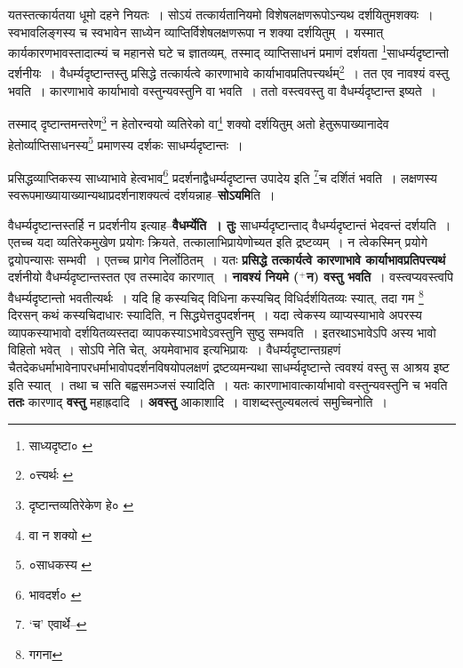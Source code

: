 \documentclass[article,12pt,a4paper]{memoir}
\newcommand{\add}[1]{($^{+}$#1)}
\begin{document}
	यतस्तत्कार्यतया धूमो दहने नियतः । सोऽयं तत्कार्यतानियमो विशेषलक्षणरूपोऽन्यथ दर्शयितुमशक्यः । स्वभावलिङ्गस्य च स्वभावेन साध्येन व्याप्तिर्विशेषलक्षणरूपा न शक्या दर्शयितुम् । यस्मात् कार्यकारणभावस्तादात्म्यं च महानसे घटे च ज्ञातव्यम्, तस्माद् व्याप्तिसाधनं प्रमाणं दर्शयता \footnote{साध्यदृष्टा० \cite{dp-msB}}साधर्म्यदृष्टान्तो दर्शनीयः । वैधर्म्यदृष्टान्तस्तु प्रसिद्धे तत्कार्यत्वे कारणाभावे कार्याभावप्रतिपत्त्यर्थम्\footnote{०त्त्यर्थः \cite{dp-edE}} । तत एव नावश्यं वस्तु भवति । कारणाभावे कार्याभावो वस्तुन्यवस्तुनि वा भवति । ततो वस्त्ववस्तु वा वैधर्म्यदृष्टान्त इष्यते । 
	  
	तस्माद् दृष्टान्तमन्तरेण\footnote{दृष्टान्तव्यतिरेकेण हे० \cite{dp-msA} \cite{dp-edP} \cite{dp-edH} \cite{dp-edE} \cite{dp-edN}} न हेतोरन्वयो व्यतिरेको वा\footnote{वा न शक्यो \cite{dp-msA} \cite{dp-edP} \cite{dp-edH} \cite{dp-edE} \cite{dp-edN}} शक्यो दर्शयितुम् अतो हेतुरूपाख्यानादेव हेतोर्व्याप्तिसाधनस्य\footnote{०साधकस्य \cite{dp-edE}} प्रमाणस्य दर्शकः साधर्म्यदृष्टान्तः । 
	  
	प्रसिद्धव्याप्तिकस्य साध्याभावे हेत्वभाव\footnote{भावदर्श० \cite{dp-msC} \cite{dp-msD}} प्रदर्शनाद्वैधर्म्यदृष्टान्त उपादेय इति \footnote{‘च’ एवार्थे--\cite{dp-msD-n}}च दर्शितं भवति । लक्षणस्य स्वरूपमाख्यायाख्यान्यथाप्रदर्शनाशक्यत्वं दर्शयन्नाह--\textbf{सोऽयमि}ति ।
	\pend
      

	  \pstart वैधर्म्यदृष्टान्तस्तर्हि न प्रदर्शनीय इत्याह--\textbf{वैधर्म्येति । तुः} साधर्म्यदृष्टान्ताद् वैधर्म्यदृष्टान्तं भेदवन्तं दर्शयति । एतच्च यदा व्यतिरेकमुखेण प्रयोगः क्रियते, तत्कालाभिप्रायेणोच्यत इति द्रष्टव्यम् । न त्वेकस्मिन् प्रयोगे द्वयोपन्यासः सम्भवी । एतच्च प्रागेव निर्लोठितम् । यतः \textbf{प्रसिद्धे तत्कार्यत्वे कारणाभावे कार्याभावप्रतिपत्त्यथं} दर्शनीयो वैधर्म्यदृष्टान्तस्तत एव तस्मादेव कारणात् । \textbf{नावश्यं नियमे \add{न} वस्तु भवति} । वस्त्वप्यवस्त्वपि वैधर्म्यदृष्टान्तो भवतीत्यर्थः । यदि हि कस्यचिद् विधिना कस्यचिद् विधिर्दर्शयितव्यः स्यात्, तदा गम \footnote{गगना} दिरसन् कथं कस्यचिदाधारः स्यादिति, न सिद्ध्येत्तदुपदर्शनम् । यदा त्वेकस्य व्याप्यस्याभावे अपरस्य व्यापकस्याभावो दर्शयितव्यस्तदा व्यापकस्याऽभावेऽवस्तुनि सुष्ठु सम्भवति । इतरथाऽभावेऽपि अस्य भावो विहितो भवेत् । सोऽपि नेति चेत्, अयमेवाभाव इत्यभिप्रायः । वैधर्म्यदृष्टान्तग्रहणं चैतदेकधर्माभावेनापरधर्माभावोपदर्शनविषयोपलक्षणं द्रष्टव्यमन्यथा साधर्म्यदृष्टान्ते त्ववश्यं वस्तु स आश्रय इष्ट इति स्यात् । तथा च सति बह्वसमञ्जसं स्यादिति । यतः कारणाभावात्कार्याभावो वस्तुन्यवस्तुनि च भवति \textbf{ततः} कारणाद् \textbf{वस्तु} महाह्रदादि । \textbf{अवस्तु} आकाशादि । वाशब्दस्तुल्यबलत्वं समुच्चिनोति ।
	\pend
      
\end{document}
